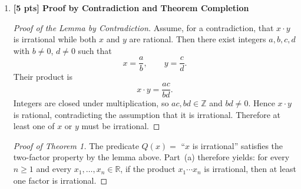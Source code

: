 \documentclass[11pt]{article}
\begin{document}
\begin{enumerate}
    \item[(c)] \textbf{[5 pts] Proof by Contradiction and Theorem Completion}
    \begin{proof}[Proof of the Lemma by Contradiction]
        Assume, for a contradiction, that $x\cdot y$ is irrational while both 
        $x$ and $y$ are rational.  Then there exist integers $a,b,c,d$ with 
        $b\neq 0$, $d\neq 0$ such that
        \[
            x = \frac{a}{b},\qquad y = \frac{c}{d}.
        \]
        Their product is
        \[
            x\cdot y = \frac{ac}{bd}.
        \]
        Integers are closed under multiplication, so $ac,bd\in\mathbb{Z}$ and 
        $bd\neq 0$.  Hence $x\cdot y$ is rational, contradicting the assumption 
        that it is irrational.  Therefore at least one of $x$ or $y$ must be irrational.
    \end{proof}

    \begin{proof}[Proof of Theorem 1]
        The predicate $Q(x) = $ ``$x$ is irrational'' satisfies the two-factor 
        property by the lemma above.  Part~(a) therefore yields: for every 
        $n\ge 1$ and every $x_1,\dots,x_n\in\mathbb{R}$, if the product 
        $x_1\cdots x_n$ is irrational, then at least one factor is irrational.
    \end{proof}
\end{enumerate}
\end{document}
